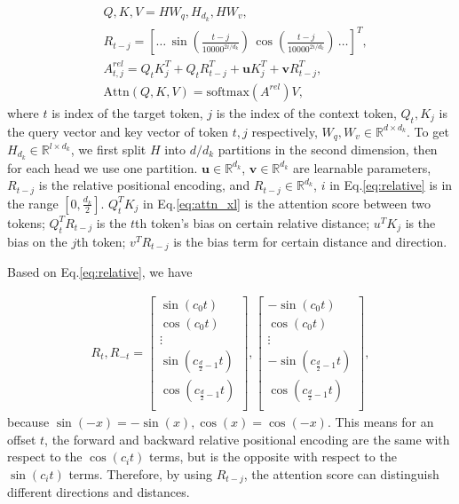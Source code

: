 \documentclass[11pt,a4paper]{article}
\begin{document}
\vspace{-1em}
{\small
\begin{align}
  & Q, K, V  =  HW_q, H_{d_k}, HW_v, \label{eq:project} \\
  & R_{t-j}\!= [\ldots \,  \sin(\frac{t-j}{10000^{2i/d_k}}) \,  \cos(\frac{t-j}{10000^{2i/d_k}}) \, \ldots]^T,  \label{eq:relative}\\
  & A^{rel}_{t,j} = Q_tK_j^T + Q_tR_{t-j}^T + \mathbf{u}K_j^T + \mathbf{v}R_{t-j}^T, \label{eq:attn_xl} \\
  & \mathrm{Attn}(Q, K, V) = \mathrm{softmax}(A^{rel})V, \label{eq:softmax_xl}
\end{align}}where $t$ is index of the target token, $j$ is the index of the context token, $Q_t, K_j$ is the query vector and key vector of token $t, j$ respectively, $W_q, W_v \in \mathbb{R}^{d \times d_k}$. To get $H_{d_k}\in \mathbb{R}^{l \times d_k}$, we first split $H$ into $d/d_k$ partitions in the second dimension, then for each head we use one partition. $\mathbf{u} \in \mathbb{R}^{d_k}$, $\mathbf{v} \in \mathbb{R}^{d_k}$ are learnable parameters,
$R_{t-j}$ is the relative positional encoding, and $R_{t-j} \in \mathbb{R}^{d_k}$, $i$ in Eq.\eqref{eq:relative} is in the range $[0, \frac{d_k}{2}]$. $Q_t^TK_j$ in Eq.\eqref{eq:attn_xl} is the attention score between two tokens; $Q_t^TR_{t-j}$ is the $t$th token's bias on certain relative distance; $u^TK_j$ is the bias on the $j$th token; $v^TR_{t-j}$ is the bias term for certain distance and direction.

Based on Eq.\eqref{eq:relative}, we have

\vspace{-1em}
{\small
\begin{align}
  R_{t}, R_{-t} = \left[ \begin{array}{c}
    \sin(c_0t)\\
    \cos(c_0t)\\
    \vdots \\
    \sin(c_{\frac{d}{2}-1}t)\\
    \cos(c_{\frac{d}{2}-1}t) \\
  \end{array} \right],
  \left[ \begin{array}{c}
    -\sin(c_0t)\\
    \cos(c_0t)\\
    \vdots \\
    -\sin(c_{\frac{d}{2}-1}t)\\
    \cos(c_{\frac{d}{2}-1}t) \\
  \end{array} \right],
\end{align}}because $\sin(-x)=-\sin(x), \cos(x)=\cos(-x)$. This means for an offset $t$, the forward and backward relative positional encoding are the same with respect to the $\cos(c_it)$ terms, but is the opposite with respect to the $\sin(c_it)$ terms. Therefore, by using $R_{t-j}$, the attention score can distinguish different directions and distances.
\end{document}
